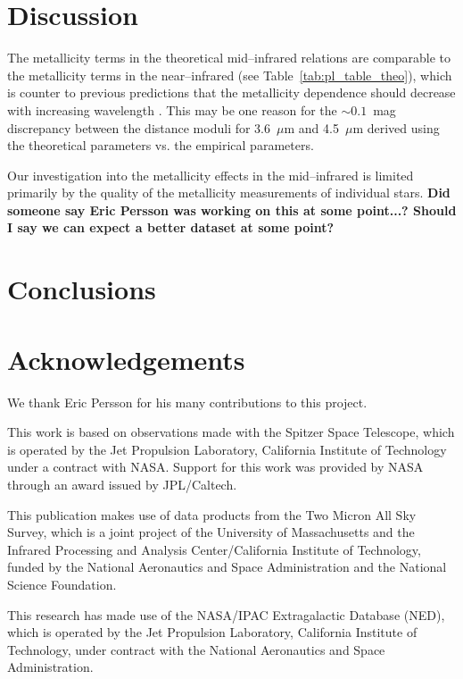 \documentclass[a4paper,fleqn,usenatbib]{mnras}
\begin{document}
\section{Discussion}
\label{sec:discussion}


The metallicity terms in the theoretical mid--infrared relations are comparable to the metallicity terms in the near--infrared (see Table~\ref{tab:pl_table_theo}), which is counter to previous predictions that the metallicity dependence should decrease with increasing wavelength \citep{2004ApJS..154..633C, 2001MNRAS.326.1183B}. This may be one reason for the $\sim\!\!0.1$~mag discrepancy between the distance moduli for 3.6~$\mu$m and 4.5~$\mu$m derived using the theoretical parameters vs. the empirical parameters.

Our investigation into the metallicity effects in the mid--infrared is limited primarily by the quality of the metallicity measurements of individual stars. {\bf Did someone say Eric Persson was working on this at some point...? Should I say we can expect a better dataset at some point?}

\section{Conclusions}
\label{sec:conclusions}

\section*{Acknowledgements}
\label{sec:acknowledgements}

We thank Eric Persson for his many contributions to this project.

This work is based on observations made with the Spitzer Space Telescope, which is operated by the Jet Propulsion Laboratory, California Institute of Technology under a contract with NASA. Support for this work was provided by NASA through an award issued by JPL/Caltech.

This publication makes use of data products from the Two Micron All Sky Survey, which is a joint project of the University of Massachusetts and the Infrared Processing and Analysis Center/California Institute of Technology, funded by the National Aeronautics and Space Administration and the National Science Foundation.

This research has made use of the NASA/IPAC Extragalactic Database (NED), which is operated by the Jet Propulsion Laboratory, California Institute of Technology, under contract with the National Aeronautics and Space Administration.
\end{document}
